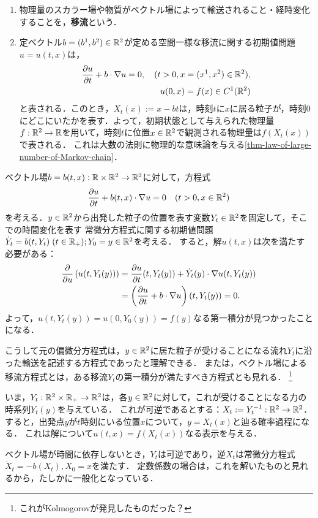 \documentclass[uplatex,dvipdfmx]{jsreport}
\begin{document}
\begin{definition}\mbox{}
    \begin{enumerate}
        \item 物理量のスカラー場や物質がベクトル場によって輸送されること・経時変化することを，\textbf{移流}という．
        \item 定ベクトル$b=(b^1,b^2)\in\mathbb{R}^2$が定める空間一様な移流に関する初期値問題$u=u(t,x)$は，
        \begin{align*}
            \frac{\partial u}{\partial t}+b\cdot\nabla u=0,\quad(t>0,x=(x^1,x^2)\in\mathbb{R}^2),\\
            u(0,x)=f(x)\in C^1(\mathbb{R}^2)
        \end{align*}
        と表される．このとき，$X_t(x):=x-bt$は，時刻$t$に$x$に居る粒子が，時刻$0$にどこにいたかを表す．よって，初期状態として与えられた物理量$f:\mathbb{R}^2\to\mathbb{R}$を用いて，時刻$t$に位置$x\in\mathbb{R}^2$で観測される物理量は$f(X_t(x))$で表される．
        これは大数の法則に物理的な意味論を与える\ref{thm-law-of-large-number-of-Markov-chain}．
    \end{enumerate}
\end{definition}

\begin{discussion}[変数係数の移流問題]
    ベクトル場$b=b(t,x):\mathbb{R}\times\mathbb{R}^2\to\mathbb{R}^2$に対して，方程式
    \[\frac{\partial u}{\partial t}+b(t,x)\cdot\nabla u=0\quad(t>0,x\in\mathbb{R}^2)\]
    を考える．$y\in\mathbb{R}^2$から出発した粒子の位置を表す変数$Y_t\in\mathbb{R}^2$を固定して，そこでの時間変化を表す
    常微分方程式に関する初期値問題$\dot{Y}_t=b(t,Y_t)\;(t\in\mathbb{R}_+);Y_0=y\in\mathbb{R}^2$を考える．
    すると，解$u(t,x)$は次を満たす必要がある：
    \begin{align*}
        \frac{\partial }{\partial u}\left(u(t,Y_t(y))\right)&=\frac{\partial u}{\partial t}(t,Y_t(y))+\dot{Y}_t(y)\cdot\nabla u(t,Y_t(y))\\
        &=\left(\frac{\partial u}{\partial t}+b\cdot\nabla u\right)(t,Y_t(y))=0.
    \end{align*}
    よって，$u(t,Y_t(y))=u(0,Y_0(y))=f(y)$なる第一積分が見つかったことになる．

    こうして元の偏微分方程式は，$y\in\mathbb{R}^2$に居た粒子が受けることになる流れ$Y_t$に沿った輸送を記述する方程式であったと理解できる．
    または，ベクトル場による移流方程式とは，ある移流$Y_t$の第一積分が満たすべき方程式とも見れる．
    \footnote{これがKolmogorovが発見したものだった？}
\end{discussion}
\begin{remark}[2つの関連]
    いま，$Y_t:\mathbb{R}^2\times\mathbb{R}_+\to\mathbb{R}^2$は，各$y\in\mathbb{R}^2$に対して，これが受けることになる力の時系列$Y_t(y)$を与えている．
    これが可逆であるとする：$X_t:=Y_t^{-1}:\mathbb{R}^2\to\mathbb{R}^2$．すると，出発点$y$が$t$時刻にいる位置$x$について，$y=X_t(x)$と辿る確率過程になる．
    これは解について$u(t,x)=f(X_t(x))$なる表示を与える．

    ベクトル場が時間に依存しないとき，$Y_t$は可逆であり，逆$X_t$は常微分方程式$\dot{X}_t=-b(X_t),X_0=x$を満たす．
    定数係数の場合は，これを解いたものと見れるから，たしかに一般化となっている．
\end{remark}
\end{document}
